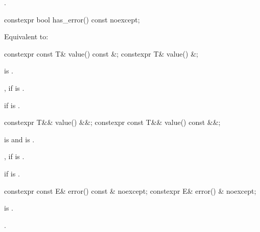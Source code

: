 \begin{itemdescr}
\pnum
\returns
{}.
\end{itemdescr}

%
\begin{itemdecl}
constexpr bool has_error() const noexcept;
\end{itemdecl}

\begin{itemdescr}
\pnum
\effects
Equivalent to:
\end{itemdescr}

%
\begin{itemdecl}
constexpr const T& value() const &;
constexpr T& value() &;
\end{itemdecl}

\begin{itemdescr}
\pnum
\mandates
{} is .

\pnum
\returns
{}, if  is .

\pnum
\throws
{} if  is .
\end{itemdescr}

%
\begin{itemdecl}
constexpr T&& value() &&;
constexpr const T&& value() const &&;
\end{itemdecl}

\begin{itemdescr}
\pnum
\mandates
{} is  and
 is .

\pnum
\returns
{}, if  is .

\pnum
\throws
{}
if  is .
\end{itemdescr}

%
\begin{itemdecl}
constexpr const E& error() const & noexcept;
constexpr E& error() & noexcept;
\end{itemdecl}

\begin{itemdescr}
\pnum
\hardexpects
{} is .

\pnum
\returns
{}.
\end{itemdescr}


